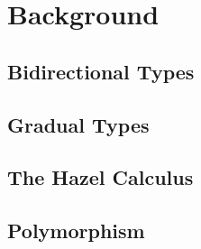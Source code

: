 \section{Background}
\label{sec:background}

\subsection{Bidirectional Types}
\label{sec:bidirectional-types}

\subsection{Gradual Types}
\label{sec:gradual-types}

\subsection{The Hazel Calculus}
\label{sec:hazel}

\subsection{Polymorphism}
\label{sec:polymorphism-background}

